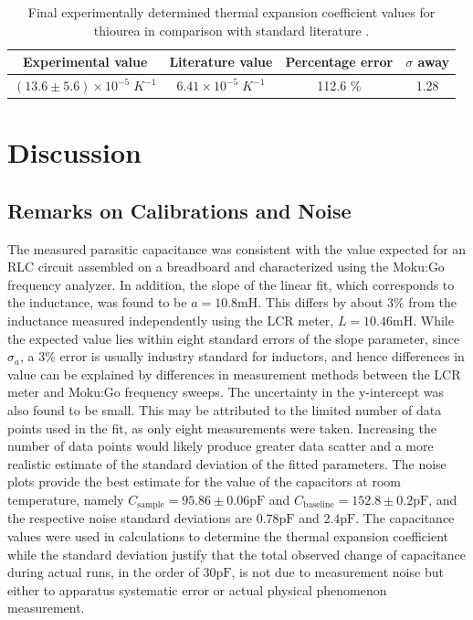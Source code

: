 \documentclass[letterpaper,12pt]{article}
\begin{document}
\begin{table}[H]
\centering

\begin{tabular}{|c|c|c|c|}
\hline
Experimental value & Literature value & Percentage error & $\sigma$ away \\ \hline
 $ (13.6 \pm5.6) \times 10^{-5}\;  K^{-1}$ & $6.41 \times 10^{-5} \; K^{-1}$ & 112.6 \%  & 1.28 \\ \hline
\end{tabular}
\label{finresults}
\caption{Final experimentally determined thermal expansion coefficient values for thiourea in comparison with standard literature \cite{thiourea}. }
\end{table}

\section{Discussion}

\subsection{Remarks on Calibrations and Noise}

The measured parasitic capacitance was consistent with the value expected for an RLC circuit assembled on a breadboard and characterized using the Moku:Go frequency analyzer. In addition, the slope of the linear fit, which corresponds to the inductance, was found to be $a = 10.8\text{mH}$. This differs by about $3\%$ from the inductance measured independently using the LCR meter, $L = 10.46\text{mH}$. While the expected value lies within eight standard errors of the slope parameter, since $\sigma_a$, a 3\% error is usually industry standard for inductors, and hence differences in value can be explained by differences in measurement methods between the LCR meter and Moku:Go frequency sweeps. 
The uncertainty in the y-intercept was also found to be small. This may be attributed to the limited number of data points used in the fit, as only eight measurements were taken. Increasing the number of data points would likely produce greater data scatter and a more realistic estimate of the standard deviation of the fitted parameters.
The noise plots provide the best estimate for the value of the capacitors at room temperature, namely $C_{\text{sample}} = 95.86 \pm 0.06\text{pF}$ and $C_{\text{baseline}} = 152.8 \pm 0.2\text{pF}$, and the respective noise standard deviations are $0.78\text{pF}$ and $2.4\text{pF}$. The capacitance values were used in calculations to determine the thermal expansion coefficient while the standard deviation justify that the total observed change of capacitance during actual runs, in the order of $30\text{pF}$, is not due to measurement noise but either to apparatus systematic error or actual physical phenomenon measurement.
\end{document}
